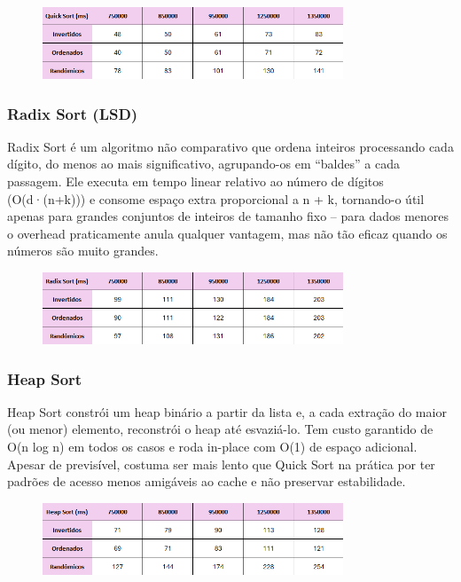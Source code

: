 \documentclass[a4paper, 12pt]{article}
\begin{document}
            \begin{figure}[ht]
                \centering
                \includegraphics[width=0.8\textwidth]{images/quick.png}
            \end{figure}

        \subsubsection{Radix Sort (LSD)}
            Radix Sort é um algoritmo não comparativo que ordena inteiros processando cada dígito, do menos ao mais significativo, agrupando-os em “baldes” a cada passagem. Ele executa em tempo linear relativo ao número de dígitos (O(d·(n+k))) e consome espaço extra proporcional a n + k, tornando-o útil apenas para grandes conjuntos de inteiros de tamanho fixo – para dados menores o overhead praticamente anula qualquer vantagem, mas não tão eficaz quando os números são muito grandes.

            \begin{figure}[ht]
                \centering
                \includegraphics[width=0.8\textwidth]{images/radix.png}
            \end{figure}

        \subsubsection{Heap Sort}
            Heap Sort constrói um heap binário a partir da lista e, a cada extração do maior (ou menor) elemento, reconstrói o heap até esvaziá-lo. Tem custo garantido de O(n log n) em todos os casos e roda in-place com O(1) de espaço adicional. Apesar de previsível, costuma ser mais lento que Quick Sort na prática por ter padrões de acesso menos amigáveis ao cache e não preservar estabilidade.

            \begin{figure}[ht]
                \centering
                \includegraphics[width=0.8\textwidth]{images/heap.png}
            \end{figure}
\end{document}
